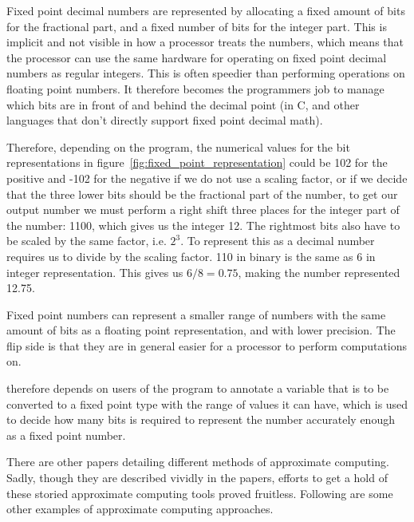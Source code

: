 Fixed point decimal numbers are represented by allocating a fixed amount of bits for the fractional part, and a fixed number of bits for the integer part. This is implicit and not visible in how a processor treats the numbers, which means that the processor can use the same hardware for operating on fixed point decimal numbers as regular integers. This is often speedier than performing operations on floating point numbers. It therefore becomes the programmers job to manage which bits are in front of and behind the decimal point (in C, and other languages that don't directly support fixed point decimal math). 



Therefore, depending on the program, the numerical values for the bit representations in figure~\ref{fig:fixed_point_representation} could be 102 for the positive and -102 for the negative if we do not use a scaling factor, or if we decide that the three lower bits should be the fractional part of the number, to get our output number we must perform a right shift three places for the integer part of the number: 1100, which gives us the integer 12. The rightmost bits also have to be scaled by the same factor, i.e. $2^3$. To represent this as a decimal number requires us to divide by the scaling factor. 110 in binary is the same as 6 in integer representation. This gives us $6/8 = 0.75$, making the number represented 12.75.

Fixed point numbers can represent a smaller range of numbers with the same amount of bits as a floating point representation, and with lower precision. The flip side is that they are in general easier for a processor to perform computations on. 

\taffo{} therefore depends on users of the program to annotate a variable that is to be converted to a fixed point type with the range of values it can have, which is used to decide how many bits is required to represent the number accurately enough as a fixed point number. 


There are other papers detailing different methods of approximate computing. Sadly, though they are described vividly in the papers, efforts to get a hold of these storied approximate computing tools proved fruitless. Following are some other examples of approximate computing approaches.

